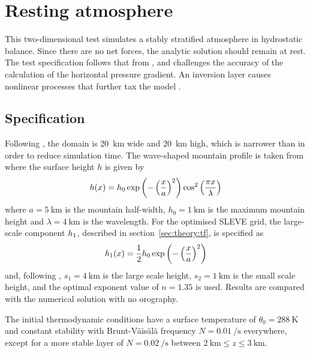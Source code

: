\section{Resting atmosphere}
\label{sec:resting}

This two-dimensional test simulates a stably stratified atmosphere in hydrostatic balance.  Since there are no net forces, the analytic solution should remain at rest.  The test specification follows that from \textcite{klemp2011}, and challenges the accuracy of the calculation of the horizontal pressure gradient.   An inversion layer causes nonlinear processes that further tax the model \autocite{good2013}.

\subsection{Specification}
Following \textcite{weller-shahrokhi2014}, the domain is \SI{20}{\kilo\meter} wide and \SI{20}{\kilo\meter} high, which is narrower than \textcite{klemp2011} in order to reduce simulation time.  The wave-shaped mountain profile is taken from \textcite{schaer2002} where the surface height $h$ is given by
\begin{align}
	h(x) = h_0 \exp \left( - \left( \frac{x}{a} \right)^2 \right) \cos^2 \left( \frac{\pi x}{\lambda} \right) \label{eqn:resting:mountain}
\end{align}
where $a = \SI{5}{\kilo\meter}$ is the mountain half-width, $h_0 = \SI{1}{\kilo\meter}$ is the maximum mountain height and $\lambda = \SI{4}{\kilo\meter}$ is the wavelength.  For the optimised SLEVE grid, the large-scale component $h_1$, described in section~\ref{sec:theory:tf}, is specified as
\begin{align}
h_1(x) = \frac{1}{2} h_0 \exp \left( - \left( \frac{x}{a} \right)^2 \right)
\end{align}
and, following \cite{leuenberger2010}, $s_1 = \SI{4}{\kilo\meter}$ is the large scale height, $s_2 = \SI{1}{\kilo\meter}$ is the small scale height, and the optimal exponent value of $n = 1.35$ is used.  Results are compared with the numerical solution with no orography.

The initial thermodynamic conditions have a surface temperature of $\theta_0 = \SI{288}{\kelvin}$ and constant stability with Brunt-V\"ais\"al\"a frequency $N = \SI{0.01}{\per\second}$ everywhere, except for a more stable layer of $N = \SI{0.02}{\per\second}$ between $\SI{2}{\kilo\meter} \leq z \leq \SI{3}{\kilo\meter}$.

